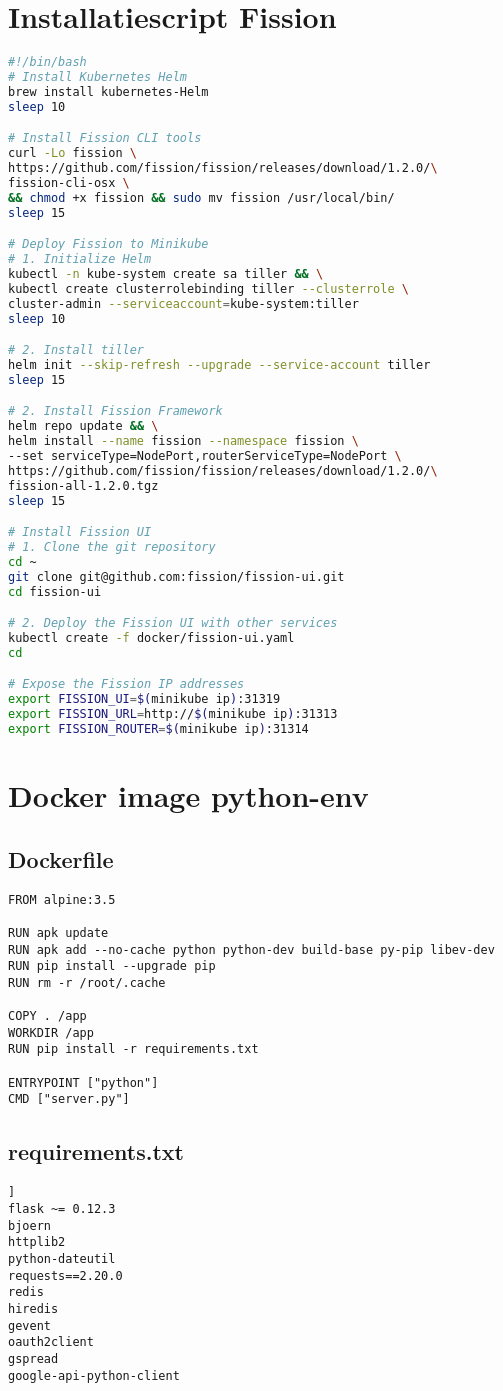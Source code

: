 \newpage
\section{Installatiescript Fission}
\label{sec:installatie-fission}
\begin{lstlisting}[language=bash]
#!/bin/bash
# Install Kubernetes Helm
brew install kubernetes-Helm
sleep 10 

# Install Fission CLI tools
curl -Lo fission \
https://github.com/fission/fission/releases/download/1.2.0/\
fission-cli-osx \
&& chmod +x fission && sudo mv fission /usr/local/bin/
sleep 15

# Deploy Fission to Minikube
# 1. Initialize Helm
kubectl -n kube-system create sa tiller && \
kubectl create clusterrolebinding tiller --clusterrole \
cluster-admin --serviceaccount=kube-system:tiller
sleep 10

# 2. Install tiller
helm init --skip-refresh --upgrade --service-account tiller
sleep 15

# 2. Install Fission Framework
helm repo update && \
helm install --name fission --namespace fission \
--set serviceType=NodePort,routerServiceType=NodePort \
https://github.com/fission/fission/releases/download/1.2.0/\
fission-all-1.2.0.tgz
sleep 15

# Install Fission UI
# 1. Clone the git repository
cd ~
git clone git@github.com:fission/fission-ui.git
cd fission-ui

# 2. Deploy the Fission UI with other services
kubectl create -f docker/fission-ui.yaml
cd

# Expose the Fission IP addresses
export FISSION_UI=$(minikube ip):31319
export FISSION_URL=http://$(minikube ip):31313
export FISSION_ROUTER=$(minikube ip):31314
\end{lstlisting}
\section{Docker image python-env}
\label{sec:docker-fission}
\subsection{Dockerfile}
\label{sec:dockerfile-fission}
\begin{lstlisting}
FROM alpine:3.5

RUN apk update
RUN apk add --no-cache python python-dev build-base py-pip libev-dev
RUN pip install --upgrade pip
RUN rm -r /root/.cache

COPY . /app
WORKDIR /app
RUN pip install -r requirements.txt

ENTRYPOINT ["python"]
CMD ["server.py"]
\end{lstlisting}

\subsection{requirements.txt}
\label{sec:requirements-fission}
\begin{lstlisting}]
flask ~= 0.12.3
bjoern
httplib2
python-dateutil
requests==2.20.0
redis
hiredis
gevent
oauth2client
gspread
google-api-python-client
\end{lstlisting}
